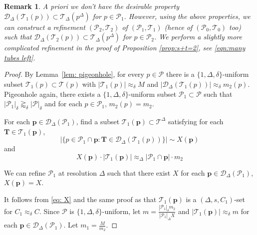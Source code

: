 \documentclass{amsart}
\newtheorem{remark}[prop]{Remark}
\newcommand{\T}{\mathcal{T}}
\newcommand{\app}{\approx}
\newcommand{\bp}{\mathbf{p}}
\newcommand{\bT}{\mathbf{T}}
\newcommand{\cD}{\mathcal{D}}
\newcommand{\cT}{\mathcal{T}}
\newcommand{\cP}{\mathcal{P}}
\begin{document}
\begin{remark}\label{rem:desired property}
    A priori we don't have the desirable property $\cD_\Delta (\cT_1 (p)) \subset \cT_\Delta (p^\Delta)$ for $p \in \cP_1$. However, using the above properties, we can construct a refinement $(\cP_2, \cT_2)$ of $(\cP_1, \cT_1)$ (hence of $(\cP_0, \cT_0)$ too) such that $\cD_\Delta (\cT_2 (p)) \subset \cT_\Delta (p^\Delta)$ for $p \in \cP_2$. We perform a slightly more complicated refinement in the proof of Proposition \ref{prop:s+t=2}, see \eqref{eqn:many tubes left}.
\end{remark}


\begin{proof}


By Lemma~\ref{lem: pigeonhole}, for every  $p\in \cP$ there is a $\{1, \Delta, \delta\}$-uniform subset $\cT_1(p)\subset \cT(p)$ with $|\cT_1(p)|\approx_{\delta} M$ and $|\cD_{\Delta}(\cT_1(p))|\approx_{\delta} m_2(p)$. Pigeonhole again, there exists a $\{1, \Delta, \delta\}$-uniform subset $\cP_1 \subset\cP$ such that $|\cP_1|_{\delta}\gtrapprox_{\delta} |\cP|_{\delta}$ and for each $p\in \cP_1$, $m_2(p)=m_2$. 

For each $\bp \in \cD_{\Delta}(\cP_1)$, 
find a subset $\cT_1(\bp)\subset \cT^{\Delta}$ satisfying  for each $\bT\in \cT_1(\bp)$, 
\[
|\{ p\in \cP_1\cap \bp: \bT\in \cD_{\Delta}(\cT_1(p))\}|\sim X(\bp)
\]
and 
\begin{equation}\label{eq: X}
X(\bp) \cdot |\cT_1(\bp)|\approx_{\Delta}|\cP_1\cap \bp|\cdot  m_2
\end{equation}


We can refine $\cP_1$ at resolution $\Delta$ such that  there exist $X$  for each $\bp\in \cD_{\Delta}(\cP_1)$, $X(\bp)=X$.


It follows from  \eqref{eq: X} and the same proof as \cite[Proposition 4.1]{orponen2021hausdorff}  that $\cT_1(\bp)$ is a $(\Delta, s, C_1)$-set for $C_1\approx_{\delta} C$. Since $\cP$ is $\{ 1, \Delta, \delta\}$-uniform,  let $m= \frac{|\cP_1|_{\delta}m_2}{|\cP_1|_{\Delta}X}$ and $|\cT_1(\bp)|\approx_{\delta} m$ for each $\bp\in \cD_{\Delta}(\cP_1)$. Let $m_1= \frac{M}{m_2}$. 
\end{proof}
\end{document}
